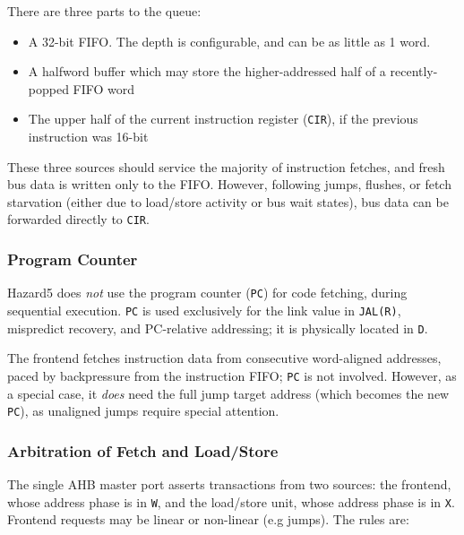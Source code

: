 There are three parts to the queue:

\begin{itemize}
	\item A 32-bit FIFO. The depth is configurable, and can be as little as 1 word.
	\item A halfword buffer which may store the higher-addressed half of a recently-popped FIFO word
	\item The upper half of the current instruction register ({\tt CIR}), if the previous instruction was 16-bit
\end{itemize}

These three sources should service the majority of instruction fetches, and fresh bus data is written only to the FIFO. However, following jumps, flushes, or fetch starvation (either due to load/store activity or bus wait states), bus data can be forwarded directly to {\tt CIR}.

\subsubsection{Program Counter}

Hazard5 does {\it not} use the program counter ({\tt PC}) for code fetching, during sequential execution. {\tt PC} is used exclusively for the link value in {\tt JAL(R)}, mispredict recovery, and PC-relative addressing; it is physically located in {\tt D}.

The frontend fetches instruction data from consecutive word-aligned addresses, paced by backpressure from the instruction FIFO; {\tt PC} is not involved. However, as a special case, it {\it does} need the full jump target address (which becomes the new {\tt PC}), as unaligned jumps require special attention.

\subsubsection{Arbitration of Fetch and Load/Store}
\label{section:fetch_ls_arb}

The single AHB master port asserts transactions from two sources: the frontend, whose address phase is in {\tt W}, and the load/store unit, whose address phase is in {\tt X}. Frontend requests may be linear or non-linear (e.g jumps). The rules are:

